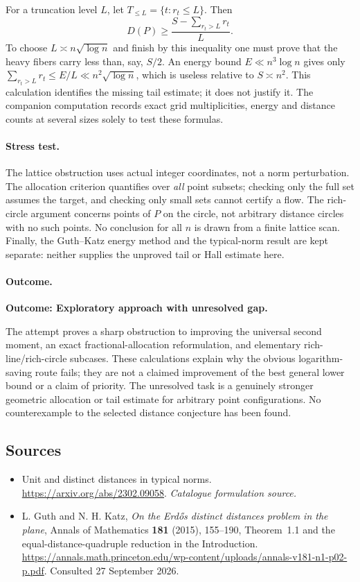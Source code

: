\documentclass[11pt,a4paper]{article}
\numberwithin{equation}{section}
\begin{document}
For a truncation level $L$, let $T_{\le L}=\{t:r_t\le L\}$. Then
\[
 D(P)\ge \frac{S-\sum_{r_t>L}r_t}{L}.
\]
To choose $L\asymp n\sqrt{\log n}$ and finish by this inequality one
must prove that the heavy fibers carry less than, say, $S/2$.
An energy bound $E\ll n^3\log n$ gives only
$\sum_{r_t>L}r_t\le E/L\ll n^2\sqrt{\log n}$, which is useless relative
to $S\asymp n^2$. This calculation identifies the missing tail estimate;
it does not justify it. The companion computation records exact grid
multiplicities, energy and distance counts at several sizes solely to
test these formulas.

\paragraph{Stress test.}
The lattice obstruction uses actual integer coordinates, not a norm
perturbation. The allocation criterion quantifies over \emph{all} point
subsets; checking only the full set assumes the target, and checking only
small sets cannot certify a flow. The rich-circle argument concerns
points of $P$ on the circle, not arbitrary distance circles with no such
points. No conclusion for all $n$ is drawn from a finite lattice scan.
Finally, the Guth--Katz energy method and the typical-norm result are
kept separate: neither supplies the unproved tail or Hall estimate here.

\paragraph{Outcome.}
\textbf{Outcome: Exploratory approach with unresolved gap.}

The attempt proves a sharp obstruction to improving the universal second
moment, an exact fractional-allocation reformulation, and elementary
rich-line/rich-circle subcases. These calculations explain why the
obvious logarithm-saving route fails; they are not a claimed improvement
of the best general lower bound or a claim of priority.
The unresolved task is a genuinely stronger geometric allocation or
tail estimate for arbitrary point configurations. No counterexample to
the selected distance conjecture has been found.
\subsection{Sources}
\begin{itemize}\raggedright
\item[\textnormal{[S1]}]\hypertarget{source:218:1}{} Unit and distinct distances in typical norms.
\url{https://arxiv.org/abs/2302.09058}.
{\small\textit{Catalogue formulation source.}}
\item[\textnormal{[E1]}]\hypertarget{extra:218:1}{}
L. Guth and N. H. Katz, \emph{On the Erd\H{o}s distinct distances problem
in the plane}, Annals of Mathematics \textbf{181} (2015), 155--190,
Theorem~1.1 and the equal-distance-quadruple reduction in the Introduction.
\url{https://annals.math.princeton.edu/wp-content/uploads/annals-v181-n1-p02-p.pdf}.
Consulted 27 September 2026.
\end{itemize}
\end{document}
